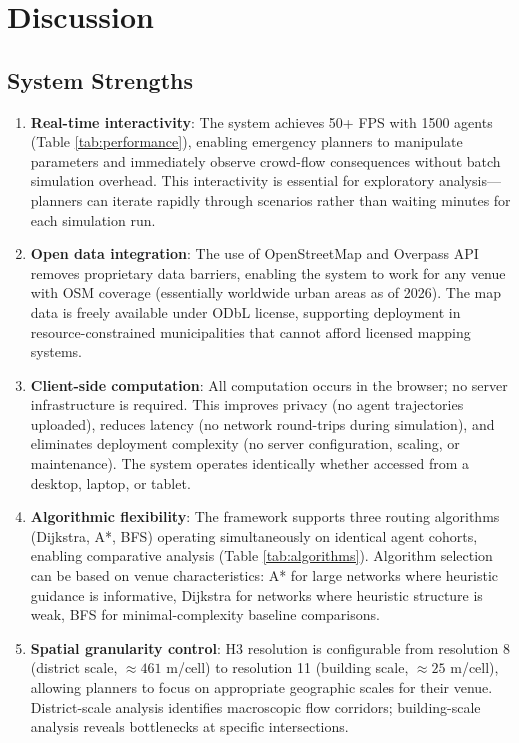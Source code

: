\documentclass[conference]{IEEEtran}
\begin{document}
\section{Discussion}

\subsection{System Strengths}

\begin{enumerate}
\item \textbf{Real-time interactivity}: The system achieves 50+ FPS with 1500 agents (Table \ref{tab:performance}), enabling emergency planners to manipulate parameters and immediately observe crowd-flow consequences without batch simulation overhead. This interactivity is essential for exploratory analysis—planners can iterate rapidly through scenarios rather than waiting minutes for each simulation run.

\item \textbf{Open data integration}: The use of OpenStreetMap and Overpass API removes proprietary data barriers, enabling the system to work for any venue with OSM coverage (essentially worldwide urban areas as of 2026). The map data is freely available under ODbL license, supporting deployment in resource-constrained municipalities that cannot afford licensed mapping systems.

\item \textbf{Client-side computation}: All computation occurs in the browser; no server infrastructure is required. This improves privacy (no agent trajectories uploaded), reduces latency (no network round-trips during simulation), and eliminates deployment complexity (no server configuration, scaling, or maintenance). The system operates identically whether accessed from a desktop, laptop, or tablet.

\item \textbf{Algorithmic flexibility}: The framework supports three routing algorithms (Dijkstra, A*, BFS) operating simultaneously on identical agent cohorts, enabling comparative analysis (Table \ref{tab:algorithms}). Algorithm selection can be based on venue characteristics: A* for large networks where heuristic guidance is informative, Dijkstra for networks where heuristic structure is weak, BFS for minimal-complexity baseline comparisons.

\item \textbf{Spatial granularity control}: H3 resolution is configurable from resolution 8 (district scale, $\approx 461$ m/cell) to resolution 11 (building scale, $\approx 25$ m/cell), allowing planners to focus on appropriate geographic scales for their venue. District-scale analysis identifies macroscopic flow corridors; building-scale analysis reveals bottlenecks at specific intersections.


\end{enumerate}
\end{document}
